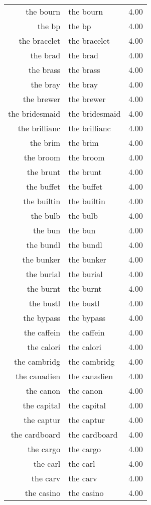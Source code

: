 \begin{table}[ht]
\begin{tabular}{rlr}
  the bourn & the bourn & 4.00 \\ 
  the bp & the bp & 4.00 \\ 
  the bracelet & the bracelet & 4.00 \\ 
  the brad & the brad & 4.00 \\ 
  the brass & the brass & 4.00 \\ 
  the bray & the bray & 4.00 \\ 
  the brewer & the brewer & 4.00 \\ 
  the bridesmaid & the bridesmaid & 4.00 \\ 
  the brillianc & the brillianc & 4.00 \\ 
  the brim & the brim & 4.00 \\ 
  the broom & the broom & 4.00 \\ 
  the brunt & the brunt & 4.00 \\ 
  the buffet & the buffet & 4.00 \\ 
  the builtin & the builtin & 4.00 \\ 
  the bulb & the bulb & 4.00 \\ 
  the bun & the bun & 4.00 \\ 
  the bundl & the bundl & 4.00 \\ 
  the bunker & the bunker & 4.00 \\ 
  the burial & the burial & 4.00 \\ 
  the burnt & the burnt & 4.00 \\ 
  the bustl & the bustl & 4.00 \\ 
  the bypass & the bypass & 4.00 \\ 
  the caffein & the caffein & 4.00 \\ 
  the calori & the calori & 4.00 \\ 
  the cambridg & the cambridg & 4.00 \\ 
  the canadien & the canadien & 4.00 \\ 
  the canon & the canon & 4.00 \\ 
  the capital & the capital & 4.00 \\ 
  the captur & the captur & 4.00 \\ 
  the cardboard & the cardboard & 4.00 \\ 
  the cargo & the cargo & 4.00 \\ 
  the carl & the carl & 4.00 \\ 
  the carv & the carv & 4.00 \\ 
  the casino & the casino & 4.00 \\ 

\end{tabular}
\end{table}
